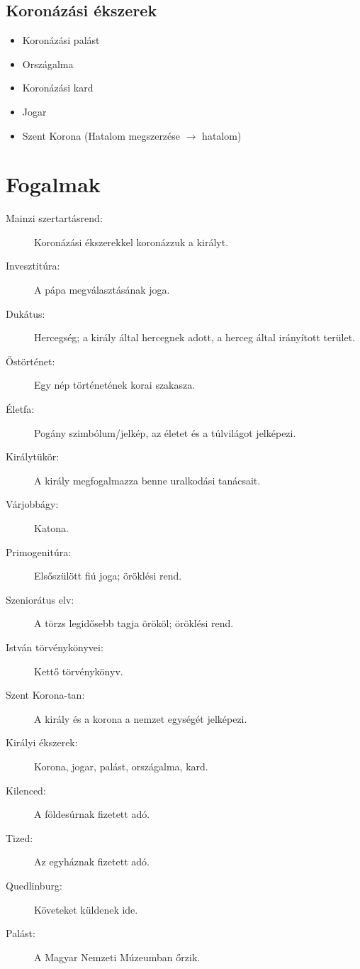\documentclass{article}
\begin{document}
\subsection{Koronázási ékszerek}
\begin{itemize}
    \item Koronázási palást
    \item Országalma
    \item Koronázási kard
    \item Jogar
    \item Szent Korona (Hatalom megszerzése $\rightarrow$ hatalom)
\end{itemize}

\section{Fogalmak}

\begin{description}
\item[Mainzi szertartásrend:]
Koronázási ékszerekkel koronázzuk a királyt.

\item[Invesztitúra:]
A pápa megválasztásának joga.

\item[Dukátus:]
Hercegség; a király által hercegnek adott, a herceg által irányított terület.

\item[Őstörténet:]
Egy nép történetének korai szakasza.

\item[Életfa:]
Pogány szimbólum/jelkép, az életet és a túlvilágot jelképezi.

\item[Királytükör:]
A király megfogalmazza benne uralkodási tanácsait.

\item[Várjobbágy:]
Katona.

\item[Primogenitúra:]
Elsőszülött fiú joga; öröklési rend.

\item[Szeniorátus elv:]
A törzs legidősebb tagja örököl; öröklési rend.

\item[István törvénykönyvei:]
Kettő törvénykönyv.

\item[Szent Korona-tan:]
A király és a korona a nemzet egységét jelképezi.

\item[Királyi ékszerek:]
Korona, jogar, palást, országalma, kard.

\item[Kilenced:]
A földesúrnak fizetett adó.

\item[Tized:]
Az egyháznak fizetett adó.

\item[Quedlinburg:]
Követeket küldenek ide.

\item[Palást:]
A Magyar Nemzeti Múzeumban őrzik.
\end{description}
\end{document}
